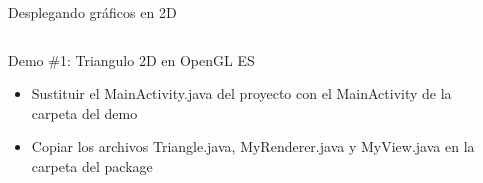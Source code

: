 \documentclass[aspectratio=169,compress]{beamer}
\begin{document}
\begin{frame}{Desplegando gráficos en 2D}

\begin{columns}
\begin{column}{0.8\textwidth}
\begin{block}{Demo \#1: Triangulo 2D en OpenGL ES}
\begin{itemize}
\item Sustituir el MainActivity.java del proyecto con el MainActivity de la carpeta del demo
\item Copiar los archivos Triangle.java, MyRenderer.java y MyView.java en la carpeta del package
\end{itemize}
\end{block}
\end{column}
\begin{column}{0.2\textwidth}
\begin{center}

\end{center}
\end{column}
\end{columns}
\end{frame}
\end{document}
